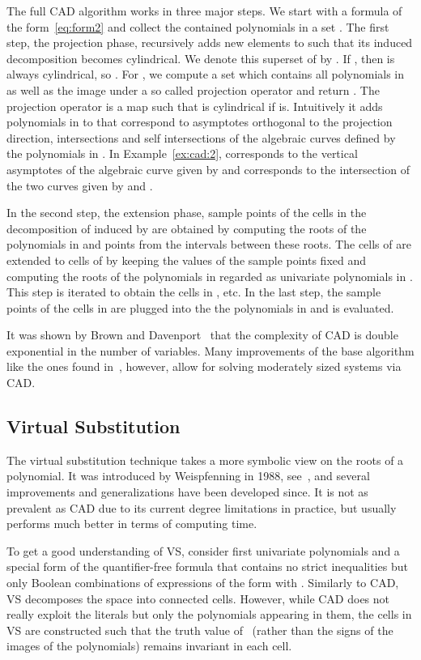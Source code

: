 \documentclass{llncs}
\begin{document}
The full CAD algorithm works in three major steps. We start with a formula
 of the form~\eqref{eq:form2} and collect the contained polynomials in a
set . The first step, the projection phase,
recursively adds new elements to  such that its induced decomposition
becomes cylindrical. We denote this superset of  by
. If , then  is always cylindrical, so
. For , we compute a set  which
contains all polynomials in  as well as
the image  under a so called projection operator and return
. The projection
operator is a map such that  is cylindrical if
 is. Intuitively it adds polynomials in
 to  that correspond to asymptotes
orthogonal to the projection direction, intersections and self intersections of
the algebraic curves defined by the polynomials in . In
Example~\ref{ex:cad:2},  corresponds to the vertical asymptotes of the
algebraic curve given by  and  corresponds to the intersection of
the two curves given by  and .

In the second step, the extension phase,
sample points of the cells in the decomposition of  induced by
 are obtained by computing the roots of the polynomials in 
and points from the intervals between these roots. The cells of  are extended to cells of  by keeping the  values of
the sample points fixed and computing the roots of the polynomials in
 regarded as univariate polynomials in . This step is
iterated to obtain the cells in ,  etc. In the last
step, the sample points of the cells in  are plugged into
the the polynomials in  and  is evaluated.

It was shown by Brown and Davenport~\cite{brown} that the complexity of CAD is
double exponential in the number of variables. Many improvements of the base
algorithm like the ones found in~\cite{hong,marekbrown,chen}, however, allow
for solving moderately sized systems via CAD.

\subsection{Virtual Substitution}

The virtual substitution technique takes a more symbolic view on
the roots of a polynomial. It was introduced by Weispfenning in 1988,
see~\cite{weispfenning}, and several improvements and generalizations have been
developed since. It is not as prevalent as CAD due to its current degree
limitations in practice, but usually performs much better in terms of computing
time.

To get a good understanding of VS, consider first univariate polynomials and a
special form of the quantifier-free formula  that contains no strict
inequalities but only Boolean combinations of expressions of the form
 with . Similarly to CAD, VS
decomposes the space into connected cells.  However, while CAD does not really
exploit the literals but only the polynomials appearing in them, the cells in VS
are constructed such that the truth value of~ (rather than the signs of
the images of the polynomials) remains invariant in each cell.
\end{document}
